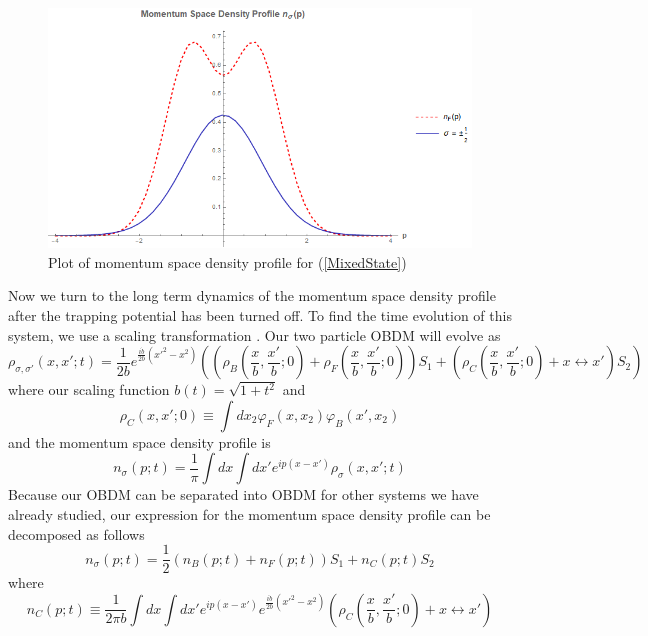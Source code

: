 \documentclass[onecolumn,english,aps,pra]{revtex4}
\begin{document}
\begin{figure}
\includegraphics[scale=0.6]{"../Plots/MomentumSpaceDProfileMixedSpinor"}
\caption{Plot of momentum space density profile for (\ref{MixedState})}
\label{fig:InitialMomentumProfile}
\end{figure}
%
Now we turn to the long term dynamics of the momentum space density profile after the trapping potential has been turned off. To find the time evolution of this system, we use a scaling transformation \cite{zel1998quantum}. Our two particle OBDM will evolve as
%
\begin{equation}
\rho_{\sigma, \sigma'}(x, x';t) = \frac{1}{2b} e^{\frac{i\dot{b}}{2b}(x'^2 - x^2)}\left(\left(\rho_B\left(\frac{x}{b},\frac{x'}{b};0\right) + \rho_F\left(\frac{x}{b},\frac{x'}{b};0\right)\right)
 S_1 + 
 \left( \rho_C\left(\frac{x}{b},\frac{x'}{b};0\right) + x \leftrightarrow x' \right)S_2\right)
\end{equation}
where our scaling function $b(t) = \sqrt{1+t^2}$ and 
\[
\rho_C(x,x';0) \equiv \int dx_2 \varphi_F(x,x_2)\varphi_B(x',x_2)
\]
%
and the momentum space density profile is
%
\begin{equation}
n_\sigma(p;t) = \frac{1}{\pi} \int dx \int dx' e^{ip(x-x')} \rho_{\sigma}(x,x';t)
\end{equation}
%
Because our OBDM can be separated into OBDM for other systems we have already studied, our expression for the momentum space density profile can be decomposed as follows
%
\begin{equation}
n_\sigma(p;t) = \frac{1}{2}\left(n_B(p;t) + n_F(p;t)\right)
 S_1 + n_C(p;t)S_2
 \label{MSDF-TimeDep}
\end{equation}
where
\begin{equation}
n_C(p;t) \equiv \frac{1}{2\pi b} \int dx \int dx' e^{ip(x-x')} e^{\frac{i\dot{b}}{2b}(x'^2 - x^2)} \left(\rho_C\left(\frac{x}{b},\frac{x'}{b};0\right) + x \leftrightarrow x'\right)
\end{equation}
\end{document}
